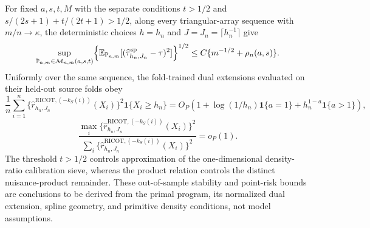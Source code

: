 For fixed \(a,s,t,M\) with the separate conditions \(t>1/2\) and \(s/(2s+1)+t/(2t+1)>1/2\), along every triangular-array sequence with \(m/n\to\kappa\), the deterministic choices \(h=h_n\) and \(J=J_n=\lceil h_n^{-1}\rceil\) give \[\sup_{\mathbb P_{n,m}\in\mathcal M_{n,m}(a,s,t)}\Bigl\{\mathbb E_{\mathbb P_{n,m}}[(\widehat\tau^{\mathrm{sp}}_{h_n,J_n}-\tau)^2]\Bigr\}^{1/2}\le C\{m^{-1/2}+\rho_n(a,s)\}.\] Uniformly over the same sequence, the fold-trained dual extensions evaluated on their held-out source folds obey \[\frac1n\sum_{i=1}^n\{\widehat r^{\mathrm{RICOT},(-k_S(i))}_{h_n,J_n}(X_i)\}^2\mathbf 1\{X_i\ge h_n\}=O_P\!\left(1+\log(1/h_n)\mathbf 1\{a=1\}+h_n^{1-a}\mathbf 1\{a>1\}\right),\] \[\frac{\max_i\{\widehat r^{\mathrm{RICOT},(-k_S(i))}_{h_n,J_n}(X_i)\}^2}{\sum_i\{\widehat r^{\mathrm{RICOT},(-k_S(i))}_{h_n,J_n}(X_i)\}^2}=o_P(1).\] The threshold \(t>1/2\) controls approximation of the one-dimensional density-ratio calibration sieve, whereas the product relation controls the distinct nuisance-product remainder. These out-of-sample stability and point-risk bounds are conclusions to be derived from the primal program, its normalized dual extension, spline geometry, and primitive density conditions, not model assumptions.